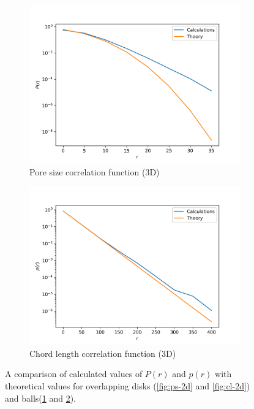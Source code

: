 \documentclass[reprint,amsmath,amssymb,aps,pre]{revtex4-1}
\begin{document}
\begin{figure}[t]
\begin{subfigure}[b]{0.475\textwidth}
    \centering
    \includegraphics[width=\textwidth]{images/ps-3d.png}
    \caption[]{{\small Pore size correlation function (3D)}}
    \label{fig:ps-3d}
  \end{subfigure}
  \hfill
  \begin{subfigure}[b]{0.475\textwidth}
    \centering
    \includegraphics[width=\textwidth]{images/cl-3d.png}
    \caption[]{{\small Chord length correlation function (3D)}}
    \label{fig:cl-3d}
  \end{subfigure}
  \caption[]{\small A comparison of calculated values of $P(r)$ and $p(r)$
    with theoretical values for overlapping disks (\cref{fig:ps-2d} and
    \cref{fig:cl-2d}) and balls(\cref{fig:ps-3d} and \cref{fig:cl-3d}).}
  \label{fig:pscl}
\end{figure}
\twocolumngrid
\end{document}
